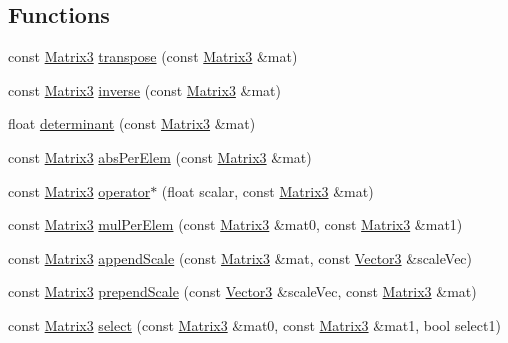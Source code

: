 \subsection*{Functions}
\begin{DoxyCompactItemize}
\item 
const \hyperlink{classVectormath_1_1Aos_1_1Matrix3}{Matrix3} \hyperlink{namespaceVectormath_1_1Aos_a645a01a97703608ae13a8b36ff9b314d}{transpose} (const \hyperlink{classVectormath_1_1Aos_1_1Matrix3}{Matrix3} \&mat)
\item 
const \hyperlink{classVectormath_1_1Aos_1_1Matrix3}{Matrix3} \hyperlink{namespaceVectormath_1_1Aos_a9981cf3cb257e1a596cdc7166ef1ccb7}{inverse} (const \hyperlink{classVectormath_1_1Aos_1_1Matrix3}{Matrix3} \&mat)
\item 
float \hyperlink{namespaceVectormath_1_1Aos_acfa19d0448ff660dd44be24140a518b9}{determinant} (const \hyperlink{classVectormath_1_1Aos_1_1Matrix3}{Matrix3} \&mat)
\item 
const \hyperlink{classVectormath_1_1Aos_1_1Matrix3}{Matrix3} \hyperlink{namespaceVectormath_1_1Aos_a82b9b577648a7f8f25020ccaec7266dd}{abs\-Per\-Elem} (const \hyperlink{classVectormath_1_1Aos_1_1Matrix3}{Matrix3} \&mat)
\item 
const \hyperlink{classVectormath_1_1Aos_1_1Matrix3}{Matrix3} \hyperlink{namespaceVectormath_1_1Aos_ab2a99a55ad0144978c81102740a72c79}{operator$\ast$} (float scalar, const \hyperlink{classVectormath_1_1Aos_1_1Matrix3}{Matrix3} \&mat)
\item 
const \hyperlink{classVectormath_1_1Aos_1_1Matrix3}{Matrix3} \hyperlink{namespaceVectormath_1_1Aos_a26cb405b026c673a80b5cb1d553fe7f1}{mul\-Per\-Elem} (const \hyperlink{classVectormath_1_1Aos_1_1Matrix3}{Matrix3} \&mat0, const \hyperlink{classVectormath_1_1Aos_1_1Matrix3}{Matrix3} \&mat1)
\item 
const \hyperlink{classVectormath_1_1Aos_1_1Matrix3}{Matrix3} \hyperlink{namespaceVectormath_1_1Aos_a3a31aa98320b0992538d6e9b81a3ba44}{append\-Scale} (const \hyperlink{classVectormath_1_1Aos_1_1Matrix3}{Matrix3} \&mat, const \hyperlink{classVectormath_1_1Aos_1_1Vector3}{Vector3} \&scale\-Vec)
\item 
const \hyperlink{classVectormath_1_1Aos_1_1Matrix3}{Matrix3} \hyperlink{namespaceVectormath_1_1Aos_a375f84fa2c6aa3a77454a11ee54ec877}{prepend\-Scale} (const \hyperlink{classVectormath_1_1Aos_1_1Vector3}{Vector3} \&scale\-Vec, const \hyperlink{classVectormath_1_1Aos_1_1Matrix3}{Matrix3} \&mat)
\item 
const \hyperlink{classVectormath_1_1Aos_1_1Matrix3}{Matrix3} \hyperlink{namespaceVectormath_1_1Aos_a969cb52a27896a2ede4e7fd83e49012b}{select} (const \hyperlink{classVectormath_1_1Aos_1_1Matrix3}{Matrix3} \&mat0, const \hyperlink{classVectormath_1_1Aos_1_1Matrix3}{Matrix3} \&mat1, bool select1)

\end{DoxyCompactItemize}
